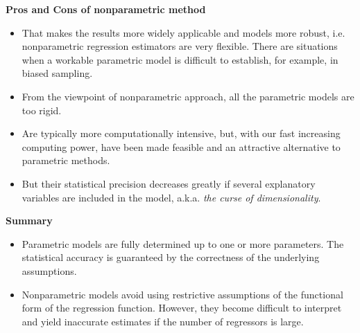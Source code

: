 \documentclass[19pt,landscaoe]{article}
\begin{document}







\newpage
{\LARGE\centerline{\textbf{Pros and Cons of nonparametric method}}}
\vskip25pt
\begin{minipage}{.9\textwidth}
    \Large
\begin{itemize}
\item That makes the results more widely applicable and models more robust, i.e. nonparametric regression estimators are very flexible. There are situations when a workable parametric model is difficult to establish, for example, in biased sampling.
\item From the viewpoint of nonparametric approach, all the parametric models are too rigid. 

\item Are typically more computationally intensive, but, with our fast increasing computing power, have been made feasible and an attractive alternative to parametric methods.
\item But their statistical precision decreases greatly if several explanatory variables are included in the model, a.k.a. {\it the curse of dimensionality}.
\end{itemize}

\end{minipage}

\newpage
{\LARGE\centerline{\textbf{Summary}}}
\vskip25pt
\begin{minipage}{.9\textwidth}
    \Large
\begin{itemize}
\item Parametric models are fully determined up to one or more parameters. The statistical accuracy is guaranteed by the correctness of the underlying assumptions. 
\item Nonparametric models avoid using restrictive assumptions of the functional form of the regression function. However, they become difficult to interpret and yield inaccurate estimates if the number of regressors is large. 
\end{itemize}

\end{minipage}
\end{document}
